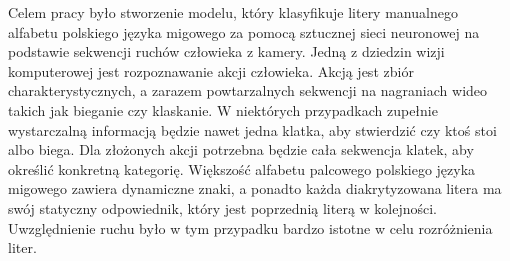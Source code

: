Celem pracy było stworzenie modelu, który klasyfikuje litery manualnego alfabetu polskiego języka migowego za pomocą sztucznej sieci neuronowej na podstawie sekwencji ruchów człowieka z kamery. Jedną z dziedzin wizji komputerowej jest rozpoznawanie akcji człowieka. Akcją jest zbiór charakterystycznych, a zarazem powtarzalnych sekwencji na nagraniach wideo takich jak bieganie czy klaskanie. W niektórych przypadkach zupełnie wystarczalną informacją będzie nawet jedna klatka, aby stwierdzić czy ktoś stoi albo biega. Dla złożonych akcji potrzebna będzie cała sekwencja klatek, aby określić konkretną kategorię. Większość alfabetu palcowego polskiego języka migowego zawiera dynamiczne znaki, a ponadto każda diakrytyzowana litera ma swój statyczny odpowiednik, który jest poprzednią literą w kolejności. Uwzględnienie ruchu było w tym przypadku bardzo istotne w celu rozróżnienia liter.
